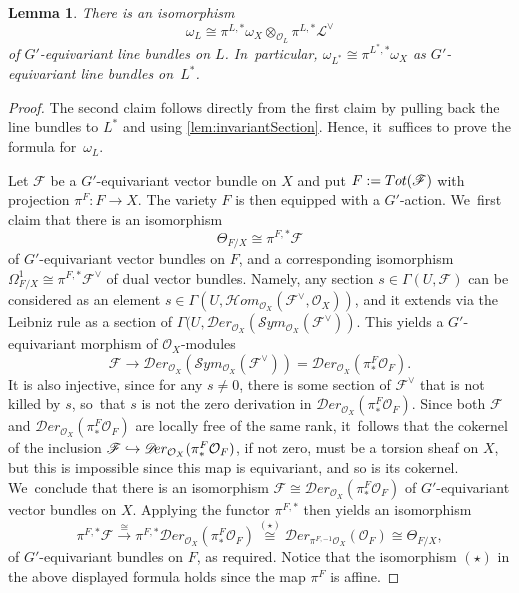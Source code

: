 \documentclass[11pt]{article}
\newcommand\hto{\mathrel{\lhook\joinrel\to}}
\newtheorem{lem}[thm]{Lemma}
\newcommand{\cD}{\mathscr{D}}
\newcommand{\Ell}{\mathscr{L}}
\newcommand{\cH}{\mathcal{H}}
\newcommand{\cO}{\mathcal{O}}\let\O\cO
\newcommand{\cS}{\mathcal{S}}
\begin{document}
\begin{lem} \label{lem:canonicalBundleOnL}
There is an isomorphism
\[
\omega_L \cong \pi^{L,*} \omega_X \otimes_{\O_L} \pi^{L,*} \Ell^\vee
\]
of $G'$-equivariant line bundles on $L$. In~particular,
$\omega_{L^*} \cong \pi^{L^*,*} \omega_X$
as $G'$-equivariant line bundles on~$L^*$.
\end{lem}

\begin{proof}
The second claim follows directly from the first claim by pulling back the line bundles to $L^*$ and using \cref{lem:invariantSection}. Hence, it~suffices to prove the formula for~$\omega_L$.

Let $\mathscr{F}$ be a $G'$-equivariant vector bundle on $X$ and put $F:=\textup{Tot}(\mathscr{F})$ with projection $\pi^F\colon F\to X$.
The variety $F$ is then equipped with a $G'$-action. We~first claim that there is an isomorphism
\[
\Theta_{F/X} \cong \pi^{F,*}\mathscr{F}
\]
of $G'$-equivariant vector bundles on $F$,
and a corresponding isomorphism $\Omega^1_{F/X}\cong \pi^{F,*}\mathscr{F}^\vee$ of dual vector bundles. Namely, any section $s\in\Gamma(U,\mathscr{F})$ can be
considered as an element $s\in \Gamma(U,{\cH\!}om_{\cO_X}(\mathscr{F}^\vee,\cO_X))$,
and it extends via the Leibniz rule as a section of
$\Gamma(U,{\cD\!}er_{\cO_X}({\cS\!}ym_{\cO_X}(\mathscr{F}^\vee))$. This yields a $G'$-equivariant morphism of $\cO_X$\nobreakdash-mod\-ules
\[
\mathscr{F} \to
{\cD\!}er_{\cO_X}({\cS\!}ym_{\cO_X}(\mathscr{F}^\vee))=
{\cD\!}er_{\cO_X}(\pi^F_*\cO_F).
\]
It is also injective,
since for any $s\neq 0$, there is some section of $\mathscr{F}^\vee$ that
is not killed by $s$, so~that $s$ is not the zero derivation in ${\cD\!}er_{\cO_X}(\pi^F_*\cO_F)$. Since both $\mathscr{F}$ and ${\cD\!}er_{\cO_X}(\pi^F_*\cO_F)$
are locally free of the same rank, it~follows that the cokernel of the inclusion
$\mathscr{F} \hto {\cD\!}er_{\cO_X}(\pi^F_*\cO_F)$, if not zero, must be a torsion sheaf on $X$, but this is impossible since this map is equivariant, and so is its cokernel. We~conclude that there is an isomorphism
$\mathscr{F} \cong {\cD\!}er_{\cO_X}(\pi^F_*\cO_F)$ of $G'$-equivariant vector bundles on $X$. Applying the functor $\pi^{F,*}$ then
yields an isomorphism
\[
\pi^{F,*}\mathscr{F} \stackrel{\cong}{\to} \pi^{F,*}
{\cD\!}er_{\cO_X}(\pi^F_*\cO_F) \stackrel{(\star)}{\cong}
{\cD\!}er_{\pi^{F,-1}\cO_X}(\cO_F) \cong \Theta_{F/X},
\]
of $G'$-equivariant bundles on $F$, as required. Notice that the isomorphism $(\star)$ in the above displayed formula holds since the map $\pi^F$ is affine.


\end{proof}
\end{document}
